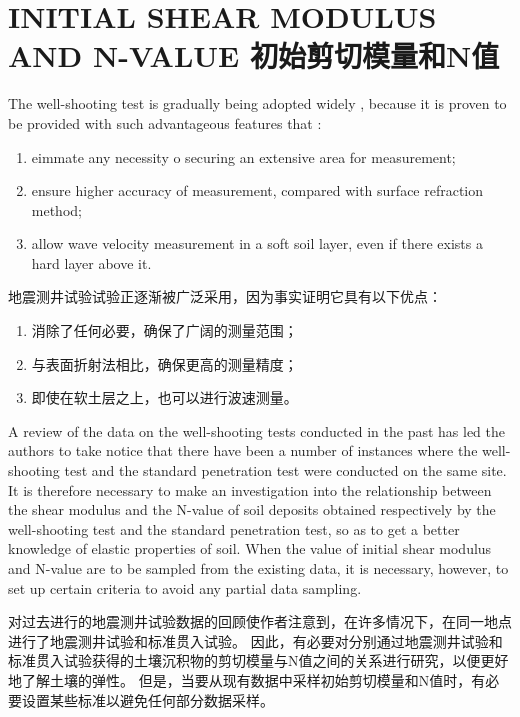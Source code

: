 \section{INITIAL SHEAR MODULUS AND N-VALUE 初始剪切模量和N值}

\begin{paracol}{2}
    
    The well-shooting test is gradually being adopted widely , because it is proven to be provided with such advantageous features that : 
    \begin{enumerate}
        \item eimmate any necessity o securing an extensive area for measurement;
        \item ensure higher accuracy of measurement, compared with surface refraction method;
        \item allow wave velocity measurement in a soft soil layer, even if there exists a hard layer above it.
    \end{enumerate}

    \switchcolumn

    地震测井试验试验正逐渐被广泛采用，因为事实证明它具有以下优点：
    \begin{enumerate}
        \item 消除了任何必要，确保了广阔的测量范围；
        \item 与表面折射法相比，确保更高的测量精度；
        \item 即使在软土层之上，也可以进行波速测量。
    \end{enumerate}

    \switchcolumn*

    A review of the data on the well-shooting tests conducted in the past has led the authors to take notice that there have been a number of instances where the well-shooting test and the standard penetration test were conducted on the same site. It is therefore necessary to make an investigation into the relationship between the shear modulus and the N-value of soil deposits obtained respectively by the well-shooting test and the standard penetration test, so as to get a better knowledge of elastic properties of soil. When the value of initial shear modulus and N-value are to be sampled from the existing data, it is necessary, however, to set up certain criteria to avoid any partial data sampling.

    \switchcolumn

    对过去进行的地震测井试验数据的回顾使作者注意到，在许多情况下，在同一地点进行了地震测井试验和标准贯入试验。 因此，有必要对分别通过地震测井试验和标准贯入试验获得的土壤沉积物的剪切模量与N值之间的关系进行研究，以便更好地了解土壤的弹性。 但是，当要从现有数据中采样初始剪切模量和N值时，有必要设置某些标准以避免任何部分数据采样。

\end{paracol}

